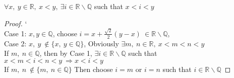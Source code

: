 \documentclass{article}
\begin{document}
	$\forall x,\ y\in \mathbb{R},\ x<y,\ \exists i\in \mathbb{R}\backslash\mathbb{Q}$ such that $x<i<y$\\
	\begin{proof}
		`\\
		Case 1: $x, y\in \mathbb{Q}$, choose $i=x+\frac{\sqrt{2}}{2}(y-x)\ \in \mathbb{R}\backslash\mathbb{Q}$, \\
		Case 2: $x,\ y\ \notin \{x,\ y\in \mathbb{Q}\}$, Obviously $\exists m,\ n\in \mathbb{R},\ x<m<n<y$\\
		If $m,\ n\in \mathbb{Q}$, then by Case 1, $\exists i\in \mathbb{R}\backslash\mathbb{Q}$ such that $x<m<i<n<y\ \Rightarrow x<i<y$\\
		If $m,\ n\  \notin \{m,\ n\in \mathbb{Q}\}$ Then choose $i=m$ or $i=n$ such that $i \in \mathbb{R}\backslash\mathbb{Q}$
	\end{proof}
\end{document}
